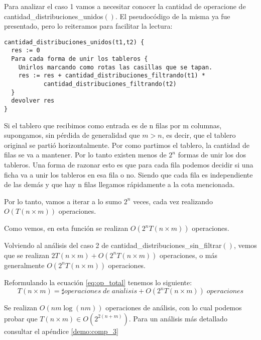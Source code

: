 \documentclass[a4paper, 12pt] {article}
\begin{document}
Para analizar el caso 1 vamos a necesitar conocer la cantidad de operacione de cantidad\_distribuciones\_unidos$\left( \right) $.
El pseudoc\'odigo de la misma ya fue presentado, pero lo reiteramos para facilitar la lectura:

\begin{verbatim}
cantidad_distribuciones_unidos(t1,t2) {
  res := 0
  Para cada forma de unir los tableros {
    Unirlos marcando como rotas las casillas que se tapan.
    res := res + cantidad_distribuciones_filtrando(t1) * 
           cantidad_distribuciones_filtrando(t2)
  }
  devolver res
}
\end{verbatim}


Si el tablero que recibimos como entrada es de n filas por m columnas, supongamos, sin p\'erdida de generalidad que $m > n$, es decir, que el tablero original se parti\'o horizontalmente. Por como partimos el tablero, la cantidad de filas se va a mantener. Por lo tanto existen menos de $2^{n}$ formas de unir los dos tableros. Una forma de razonar esto es que para cada fila podemos decidir si una ficha va a unir los tableros en esa fila o no. Siendo que cada fila es independiente de las dem\'as y que hay n filas llegamos r\'apidamente a la cota mencionada.

Por lo tanto, vamos a iterar a lo sumo $2^{n}$ veces, cada vez realizando $ O\left( T\left( n \times m\right) \right) $ operaciones.

Como vemos, en esta funci\'on se realizan $O\left( 2^{n} T\left( n \times m\right) \right) $ operaciones.

Volviendo al an\'alisis del caso 2 de cantidad\_distribuciones\_sin\_filtrar$\left( \right) $, vemos que se realizan $2T\left( n \times m\right) + O\left( 2^{n} T\left( n \times m\right) \right)$ operaciones, o m\'as generalmente $O\left( 2^{n} T\left( n \times m\right) \right)$ operaciones.

Reformulando la ecuaci\'on \ref{eq:op_total} tenemos lo siguiente:
\begin{equation}
 T\left( n \times m\right) = \sharp operaciones\; de\; an\acute{a}lisis + O\left( 2^{n} T\left( n \times m\right) \right) \; operaciones 
\end{equation}

Se realizan $O\left( nm \log\left(  nm \right) \right) $ operaciones de an\'alisis, con lo cual podemos probar que $T\left( n \times m\right) \in O(2^{2\left( n+m\right) })$. Para un an\'alisis m\'as detallado consultar el ap\'endice \ref{demo:comp_3}
\end{document}
